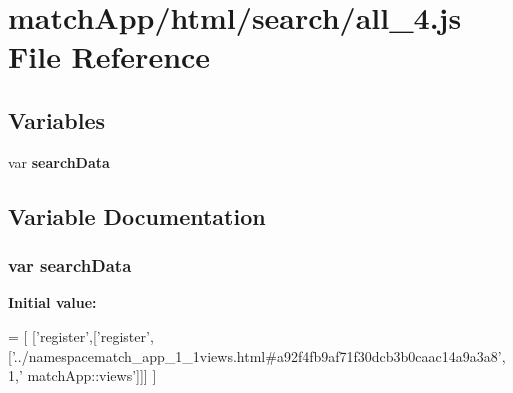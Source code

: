 \section{match\+App/html/search/all\+\_\+4.js File Reference}
\label{all__4_8js}
\subsection*{Variables}
\begin{DoxyCompactItemize}
\item 
var {\bf search\+Data}
\end{DoxyCompactItemize}


\subsection{Variable Documentation}
\subsubsection[{search\+Data}]{\setlength{\rightskip}{0pt plus 5cm}var search\+Data}\label{all__4_8js_ad01a7523f103d6242ef9b0451861231e}
{\bfseries Initial value\+:}
\begin{DoxyCode}
=
[
  [\textcolor{stringliteral}{'register'},[\textcolor{stringliteral}{'register'},[\textcolor{stringliteral}{'../namespacematch\_app\_1\_1views.html#a92f4fb9af71f30dcb3b0caac14a9a3a8'},1,\textcolor{stringliteral}{'
      matchApp::views'}]]]
]
\end{DoxyCode}
